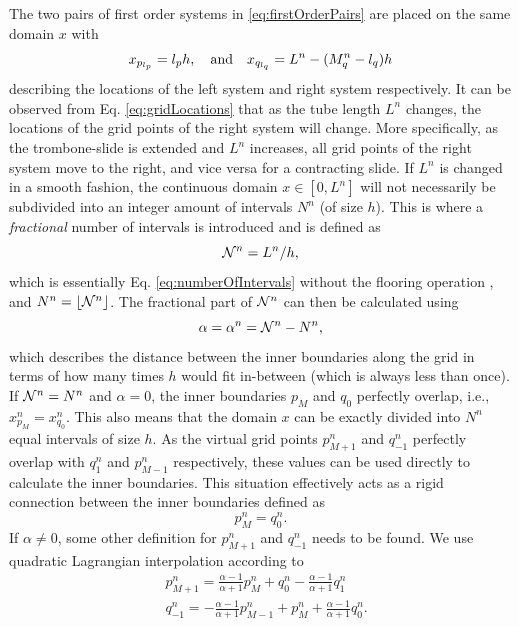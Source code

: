 The two pairs of first order systems in \eqref{eq:firstOrderPairs} are placed on the same domain $x$ with
\begin{equation}\label{eq:gridLocations}
    x_{p_{l_p}} = {l_p} h, \quad \text{and}\quad
    x_{q_{l_q}} = L^n-(M_q^n - {l_q})h
\end{equation}
describing the locations of the left system and right system respectively. It can be observed from Eq. \eqref{eq:gridLocations} that as the tube length $L^n$ changes, the locations of the grid points of the right system will change. More specifically, as the trombone-slide is extended and $L^n$ increases, all grid points of the right system move to the right, and vice versa for a contracting slide. If $L^n$ is changed in a smooth fashion, the continuous domain $x \in [0,L^n]$ will not necessarily be subdivided into an integer amount of intervals $N^n$ (of size $h$). This is where a \textit{fractional} number of intervals is introduced and is defined as 
\begin{equation}\label{eq:nfrac}
    \mathcal{N}^n = L^n/h,
\end{equation}
which is essentially Eq. \eqref{eq:numberOfIntervals} without the flooring operation , and $N^n = \lfloor \mathcal{N}^n \rfloor$. The fractional part of $\mathcal{N}^n$ can then be calculated using
\begin{equation}\label{eq:alphaDef}
    \alpha = \alpha^n = \mathcal{N}^n - N^n,
\end{equation}
which describes the distance between the inner boundaries along the grid in terms of how many times $h$ would fit in-between (which is always less than once). If $\mathcal{N}^n = N^n$ and $\alpha = 0$, the inner boundaries $p_M$ and $q_0$ perfectly overlap, i.e., $x_{p_M}^n = x_{q_0}^n$. This also means that the domain $x$ can be exactly divided into $N^n$ equal intervals of size $h$. As the virtual grid points $p_{M+1}^n$ and $q_{-1}^n$ perfectly overlap with $q_{1}^n$ and $p_{M-1}^n$ respectively, these values can be used directly to calculate the inner boundaries. This situation effectively acts as a rigid connection between the inner boundaries defined as
\begin{equation}\label{eq:rigidConn}
    p_M^n = q_0^n.
\end{equation}
%
If $\alpha \neq 0$, some other definition for $p_{M+1}^n$ and $q_{-1}^n$ needs to be found. We use quadratic Lagrangian interpolation according to
\begin{subequations}\label{eq:connectionInterpol}
\begin{align}
        &p_{M+1}^n = \frac{\alpha - 1}{\alpha + 1}p_{M}^n + q_0^n - \frac{\alpha - 1}{\alpha + 1}q_1^n
    \label{eq:calcPMp1}\\
        &q_{-1}^n
        =-\frac{\alpha - 1}{\alpha + 1}p_{M-1}^n + p_{M}^n+ \frac{\alpha - 1}{\alpha + 1}q_{0}^n.\label{eq:calcQm1}
\end{align}
\end{subequations}
